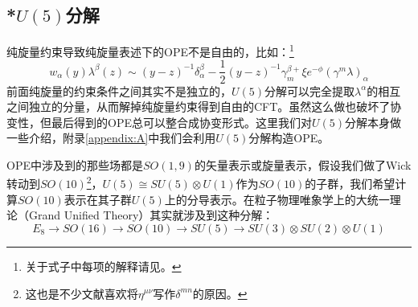 \subsection{*$U(5)$分解}
\label{sec:u5}
纯旋量约束导致纯旋量表述下的OPE不是自由的，比如：\footnote{关于式子中每项的解释请见\cite{Berkovits:2000fe}。}
\begin{equation}
	\label{eq:5.55}
	w_\alpha(y)\lambda^\beta(z)\sim(y-z)^{-1}\delta_\alpha^\beta-\frac{1}{2}(y-z)^{-1}\gamma_m^{\beta+}\xi e^{-\phi}(\gamma^m\lambda)_\alpha
\end{equation}
前面纯旋量的约束条件之间其实不是独立的，$U(5)$分解可以完全提取$\lambda^\alpha$的相互之间独立的分量，从而解掉纯旋量约束得到自由的CFT。虽然这么做也破坏了协变性，但最后得到的OPE总可以整合成协变形式。这里我们对$U(5)$分解本身做一些介绍，附录\ref{appendix:A}中我们会利用$U(5)$分解构造OPE。

OPE中涉及到的那些场都是$SO(1,9)$的矢量表示或旋量表示，假设我们做了Wick转动到$SO(10)$\footnote{这也是不少文献喜欢将$\eta^{\mu\nu}$写作$\delta^{mn}$的原因。}，$U(5)\cong SU(5)\otimes U(1)$作为$SO(10)$的子群，我们希望计算$SO(10)$表示在其子群$U(5)$上的分导表示。在粒子物理唯象学上的大统一理论（Grand Unified Theory）其实就涉及到这种分解：\cite{Georgi:2000vve,Zee:2016fuk}
\begin{equation}
	E_8\to SO(16)\to SO(10)\to SU(5)\to SU(3)\otimes SU(2)\otimes U(1)
\end{equation}

